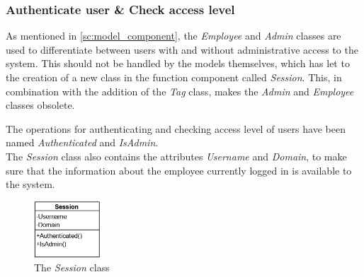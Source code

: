 \subsubsection{Authenticate user \& Check access level}
As mentioned in \autoref{sc:model_component}, the \textit{Employee} and \textit{Admin} classes are used to differentiate between users with and without administrative access to the system. This should not be handled by the models themselves, which has let to the creation of a new class in the function component called \textit{Session}. This, in combination with the addition of the \textit{Tag} class, makes the \textit{Admin} and \textit{Employee} classes obsolete.
\par
The operations for authenticating and checking access level of users have been named \textit{Authenticated} and \textit{IsAdmin}. \\
The \textit{Session} class also contains the attributes \textit{Username} and \textit{Domain}, to make sure that the information about the employee currently logged in is available to the system.

\begin{figure}[H]
    \centering
    \includegraphics[width=0.22\textwidth]{figures/FunctionComponent/Session.png}
    \caption{The \textit{Session} class}
    \label{fig:session_class}
\end{figure}


